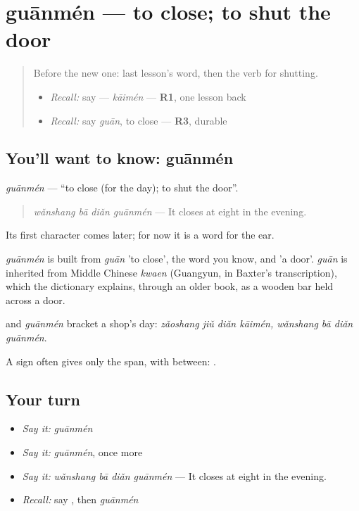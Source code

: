 \section[guānmén]{guānmén — to close; to shut the door}

\label{lesson:ZH-C155-guanmen}



\begin{quote}
Before the new one: last lesson's word, then the verb for shutting.

\begin{itemize}
\raggedright
  \item \emph{Recall:} say  — \emph{kāimén} — \textbf{R1}, one lesson back
  \item \emph{Recall:} say \emph{guān}, to close — \textbf{R3}, durable
\end{itemize}
\end{quote}

\subsection*{You'll want to know: guānmén}
\emph{guānmén} — \textquotedblleft{}to close (for the day); to shut the door\textquotedblright{}.

\begin{quote}
\emph{wǎnshang bā diǎn guānmén} — It closes at eight in the evening.
\end{quote}

Its first character comes later; for now it is a word for the ear.

\begin{cousinweb}
\emph{guānmén} is built from \emph{guān} 'to close', the word you know, and  'a door'. \emph{guān} is inherited from Middle Chinese \emph{kwaen} (Guangyun, in Baxter's transcription), which the dictionary explains, through an older book, as a wooden bar held across a door.
\end{cousinweb}

\begin{grammarlens}[title={What you've built}]
 and \emph{guānmén} bracket a shop's day: \emph{zǎoshang jiǔ diǎn kāimén, wǎnshang bā diǎn guānmén}.

A sign often gives only the span, with  between: .
\end{grammarlens}

\subsection*{Your turn}
\begin{itemize}
\raggedright
  \item \emph{Say it:} \emph{guānmén}
  \item \emph{Say it:} \emph{guānmén}, once more
  \item \emph{Say it:} \emph{wǎnshang bā diǎn guānmén} — It closes at eight in the evening.
  \item \emph{Recall:} say , then \emph{guānmén}
\end{itemize}

